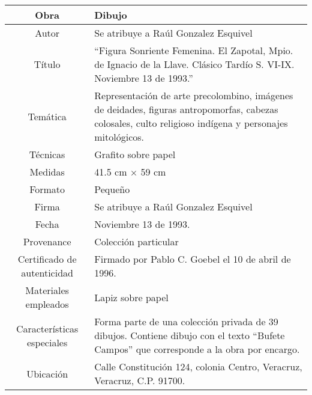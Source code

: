 \begin{table}[H]
\centering
\begin{tabular}{|c|m{}|}
\hline
Obra& Dibujo	\\
\hline
Autor & Se atribuye a Ra\'ul Gonzalez Esquivel\\
\hline
T\'itulo & ``Figura Sonriente Femenina. El Zapotal, Mpio. de Ignacio de la Llave. Cl\'asico Tard\'io S. VI-IX. Noviembre 13 de 1993.''\\
\hline
Tem\'atica & Representaci\'on de arte precolombino, im\'agenes de deidades, figuras antropomorfas, cabezas colosales, culto religioso ind\'igena y personajes mitol\'ogicos.\\
\hline
T\'ecnicas &Grafito sobre papel \\
\hline
Medidas & 41.5 cm $\times$ 59 cm \\
\hline
 Formato & Peque\~no \\
 \hline
 Firma & Se atribuye a Ra\'ul Gonzalez Esquivel\\ 
 \hline
  Fecha & Noviembre 13 de 1993. \\
 \hline
 Provenance & Colecci\'on particular\\
 \hline
 Certificado de autenticidad& Firmado por Pablo C. Goebel el 10 de abril de 1996.  \\
 \hline 
  Materiales empleados & Lapiz sobre papel\\
 \hline
 Caracter\'isticas especiales & Forma parte de una colecci\'on privada de 39 dibujos. 
Contiene dibujo con el texto ``Bufete Campos'' que corresponde a la obra por encargo. \\
\hline 
Ubicaci\'on & Calle Constituci\'on 124, colonia Centro, Veracruz, Veracruz, C.P. 91700.\\
\hline

\end{tabular}
\end{table}

